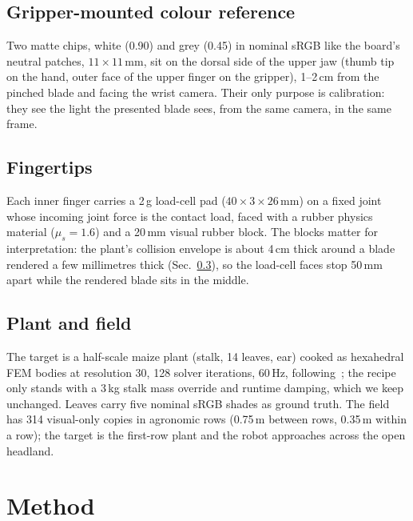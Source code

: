 \documentclass[letterpaper, 10 pt, conference]{ieeeconf}
\begin{document}
\subsection{Gripper-mounted colour reference}\label{sec:chips}
Two matte chips, white (0.90) and grey (0.45) in nominal sRGB like the board's neutral
patches, $11{\times}11$\,mm, sit on the dorsal side of the upper jaw (thumb tip on the hand,
outer face of the upper finger on the gripper), 1--2\,cm from the pinched blade and facing
the wrist camera. Their only purpose is calibration: they see the light the presented blade
sees, from the same camera, in the same frame.

\subsection{Fingertips}
Each inner finger carries a 2\,g load-cell pad ($40{\times}3{\times}26$\,mm) on a fixed joint
whose incoming joint force is the contact load, faced with a rubber physics material
($\mu_s=1.6$) and a 20\,mm visual rubber block. The blocks matter for interpretation: the
plant's collision envelope is about 4\,cm thick around a blade rendered a few millimetres
thick (Sec.~\ref{sec:plant}), so the load-cell faces stop 50\,mm apart while the rendered
blade sits in the middle.

\subsection{Plant and field}\label{sec:plant}
The target is a half-scale maize plant (stalk, 14 leaves, ear) cooked as hexahedral FEM
bodies at resolution 30, 128 solver iterations, 60\,Hz, following~\cite{plantrepo}; the
recipe only stands with a 3\,kg stalk mass override and runtime damping, which we keep
unchanged. Leaves carry five nominal sRGB shades as ground truth. The field has 314
visual-only copies in agronomic rows (0.75\,m between rows, 0.35\,m within a row); the target
is the first-row plant and the robot approaches across the open headland.

\section{Method}\label{sec:method}
\end{document}
